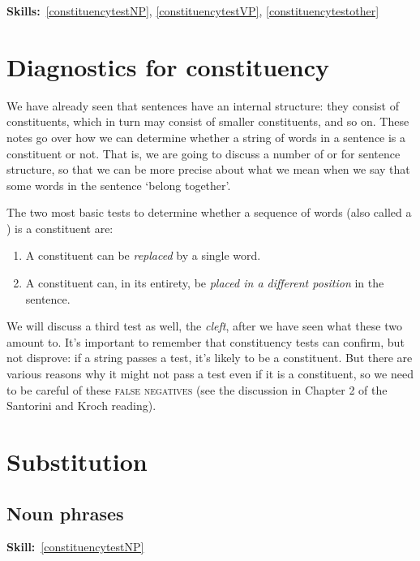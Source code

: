 \documentclass{article}
\begin{document}
\maketitle
\subtitle{Topic 2 Course Notes: Constituent Structure and Constituency Tests}
\hfill{}\textbf{Skills:}~\ref{constituencytestNP},
\ref{constituencytestVP},
\ref{constituencytestother}

\section{Diagnostics for constituency}

We have already seen that sentences have an internal structure: they consist of constituents, which in turn may consist of smaller constituents, and so on. 
These notes go over how we can determine whether a string of words in a sentence is a constituent or not.
That is, we are going to discuss a number of  or  for sentence structure, so that we can be more precise about what we mean when we say that some words in the sentence `belong together'.

The two most basic tests to determine whether a sequence of words (also called a ) is a constituent are:

\begin{enumerate}
	\item A constituent can be \emph{replaced} by a single word.
	\item A constituent can, in its entirety, be \emph{placed in a different position} in the sentence.
\end{enumerate}

We will discuss a third test as well, the \emph{cleft}, after we have seen what these two amount to. It's important to remember that constituency tests can confirm, but not disprove: if a string passes a test, it's likely to be a constituent. But there are various reasons why it might not pass a test even if it is a constituent, so we need to be careful of these \textsc{false negatives} (see the discussion in Chapter 2 of the Santorini and Kroch reading).

\section{Substitution}

\subsection{Noun phrases}
\hfill{}\textbf{Skill:}~\ref{constituencytestNP}
\end{document}
